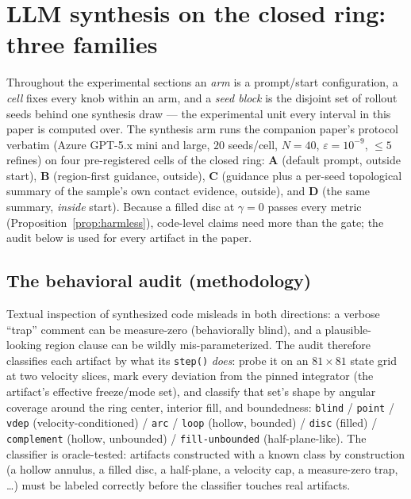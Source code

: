 \documentclass[11pt]{article}
\theoremstyle{remark}
\begin{document}
\section{LLM synthesis on the closed ring: three families}
\label{sec:synthesis}

Throughout the experimental sections an \emph{arm} is a prompt/start
configuration, a \emph{cell} fixes every knob within an arm, and a
\emph{seed block} is the disjoint set of rollout seeds behind one
synthesis draw --- the experimental unit every interval in this paper is
computed over. The synthesis arm runs the companion paper's protocol
verbatim
(Azure GPT-5.x mini and large, $20$ seeds/cell, $N = 40$,
$\varepsilon = 10^{-9}$, $\le 5$ refines) on four pre-registered cells of
the closed ring: \textbf{A} (default prompt, outside start), \textbf{B}
(region-first guidance, outside), \textbf{C} (guidance plus a per-seed
topological summary of the sample's own contact evidence, outside), and
\textbf{D} (the same summary, \emph{inside} start). Because a filled disc
at $\gamma = 0$ passes every metric (Proposition~\ref{prop:harmless}),
code-level claims need more than the gate; the audit below is used for
every artifact in the paper.

\subsection{The behavioral audit (methodology)}
\label{sec:audit}

Textual inspection of synthesized code misleads in both directions: a
verbose ``trap'' comment can be measure-zero (behaviorally blind), and a
plausible-looking region clause can be wildly mis-parameterized. The audit
therefore classifies each artifact by what its \texttt{step()}
\emph{does}: probe it on an $81\times81$ state grid at two velocity
slices, mark every deviation from the pinned integrator (the artifact's
effective freeze/mode set), and classify that set's shape by angular
coverage around the ring center, interior fill, and boundedness:
\texttt{blind} / \texttt{point} / \texttt{vdep} (velocity-conditioned) /
\texttt{arc} / \texttt{loop} (hollow, bounded) / \texttt{disc} (filled) /
\texttt{complement} (hollow, unbounded) / \texttt{fill-unbounded}
(half-plane-like). The classifier is oracle-tested: artifacts constructed
with a known class by construction (a hollow annulus, a filled disc, a
half-plane, a velocity cap, a measure-zero trap, \ldots) must be labeled
correctly before the classifier touches real artifacts.
\end{document}
